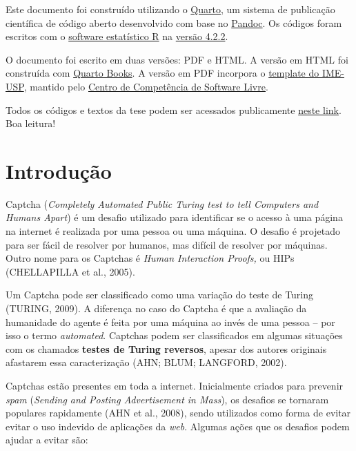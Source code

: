\documentclass[12pt,twoside,brazilian]{book}
\begin{document}

Este documento foi construído utilizando o
\href{https://quarto.org/}{Quarto}, um sistema de publicação científica
de código aberto desenvolvido com base no
\href{https://pandoc.org/}{Pandoc}. Os códigos foram escritos com o
\href{https://cran.r-project.org/}{software estatístico R} na
\href{https://cran.r-project.org/bin/windows/base/}{versão 4.2.2}.

O documento foi escrito em duas versões: PDF e HTML. A versão em HTML
foi construída com \href{https://quarto.org/docs/books/}{Quarto Books}.
A versão em PDF incorpora o
\href{https://gitlab.com/ccsl-usp/modelo-latex}{template do IME-USP},
mantido pelo \href{https://ccsl.ime.usp.br/}{Centro de Competência de
Software Livre}.

Todos os códigos e textos da tese podem ser acessados publicamente
\href{https://github.com/jtrecenti/doutorado}{neste link}. Boa leitura!


\hypertarget{sec-introducao}{%
\chapter{Introdução}\label{sec-introducao}}


Captcha (\emph{Completely Automated Public Turing test to tell Computers
and Humans Apart}) é um desafio utilizado para identificar se o acesso à
uma página na internet é realizada por uma pessoa ou uma máquina. O
desafio é projetado para ser fácil de resolver por humanos, mas difícil
de resolver por máquinas. Outro nome para os Captchas é \emph{Human
Interaction Proofs,} ou HIPs (CHELLAPILLA et al., 2005).

Um Captcha pode ser classificado como uma variação do teste de Turing
(TURING, 2009). A diferença no caso do Captcha é que a avaliação da
humanidade do agente é feita por uma máquina ao invés de uma pessoa --
por isso o termo \emph{automated}. Captchas podem ser classificados em
algumas situações com os chamados \textbf{testes de Turing reversos},
apesar dos autores originais afastarem essa caracterização (AHN; BLUM;
LANGFORD, 2002).

Captchas estão presentes em toda a internet. Inicialmente criados para
prevenir \emph{spam} (\emph{Sending and Posting Advertisement in Mass}),
os desafios se tornaram populares rapidamente (AHN et al., 2008), sendo
utilizados como forma de evitar evitar o uso indevido de aplicações da
\emph{web}. Algumas ações que os desafios podem ajudar a evitar são:
\end{document}

